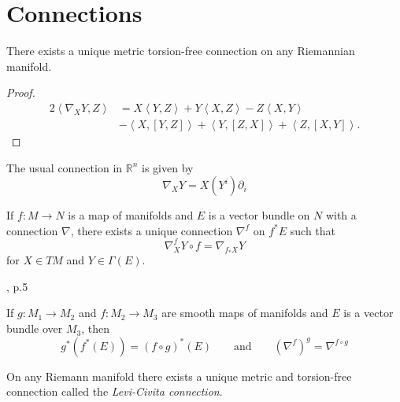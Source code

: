 \section{Connections}
\label{section-connections}

\begin{theorem}[Miracle]
\label{theorem-miracle}
There exists a unique metric torsion-free
connection on any Riemannian manifold.
\end{theorem}

\begin{proof}
$$
\begin{aligned}
2\left\langle{}\nabla_XY,Z\right\rangle{}
&=X\left\langle{}Y,Z\right\rangle{}+Y\left\langle{}X,Z\right\rangle{}-
Z\left\langle{}X,Y\right\rangle{}\\
&-\left\langle{}X,[Y,Z]\right\rangle{}+\left\langle{}Y,[Z,X]\right\rangle{}+
\left\langle{}Z,[X,Y]\right\rangle{}.
\end{aligned}
$$
\end{proof}

\begin{example}
\label{example-euclidean-connection}
The usual connection in $\mathbb{R}^n$ is
given by
$$
\nabla_XY=X(Y^i)\partial_i
$$
\end{example}

\begin{proposition}
\label{proposition-exist-pullb-conne}
If $f:M \to N$ is a map of manifolds
and $E$ is a vector bundle on $N$
with a connection $\nabla$,
there exists a unique connection $\nabla^f$
on $f^*E$ such that
$$
\nabla^f_XY\circ f=\nabla_{f_*X}Y
$$
for $X \in TM$ and $Y \in \Gamma(E)$.
\end{proposition}

\begin{lemma}
\label{lemma-compo-pullb-conne}
\begin{reference}
\cite{aulas}, p.5
\end{reference}
If $g:M_1\to M_2$ and $f:M_2\to M_3$ are
smooth maps of
manifolds and $E$ is a vector bundle over
$M_3$, then
$$
g^* (f^* (E))=(f\circ g)^* (E)\qquad
\text{and}\qquad
(\nabla^f)^g=\nabla^{f\circ g}
$$
\end{lemma}

\begin{proposition}
\label{proposition-existence-of-levi-civita}
On any Riemann manifold
there exists a unique metric and torsion-free
connection called the {\it Levi-Civita
connection}.
\end{proposition}

